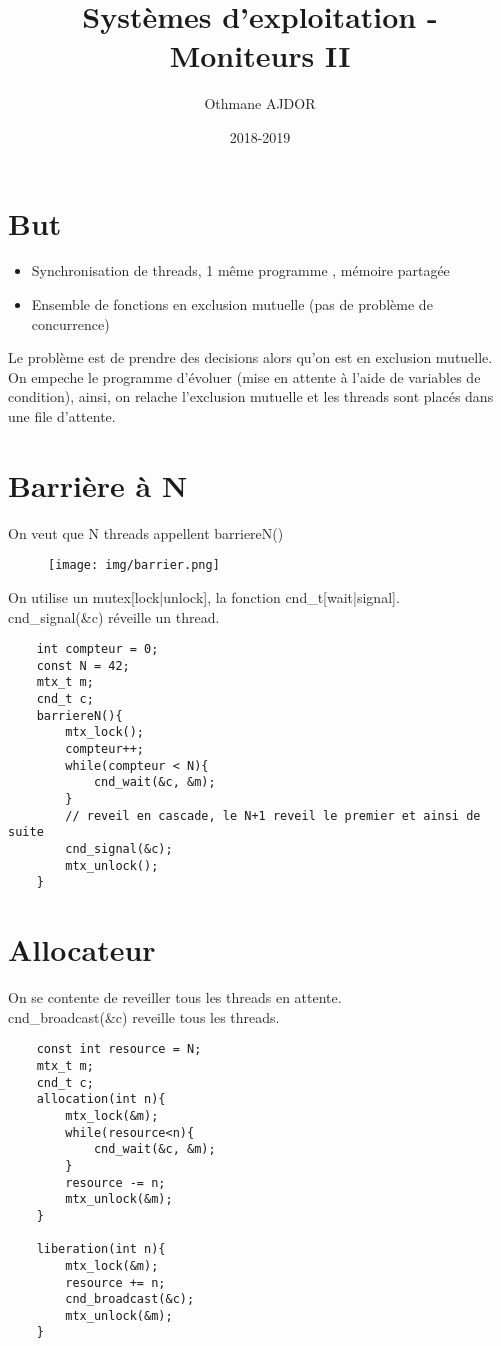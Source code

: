 \documentclass[11pt]{article}
\title{Systèmes d'exploitation - Moniteurs II}
\author{Othmane AJDOR}
\date{2018-2019}
\begin{document}
\maketitle

\pagebreak
\tableofcontents
\pagebreak

\section{But}
\begin{itemize}
	\item Synchronisation de threads, 1 même programme , mémoire partagée
	\item Ensemble de fonctions en exclusion mutuelle (pas de problème de concurrence)
\end{itemize}
Le problème est de prendre des decisions alors qu'on est en exclusion mutuelle.
On empeche le programme d'évoluer (mise en attente à l'aide de variables de condition), ainsi, on relache l'exclusion mutuelle et les threads sont placés dans une file d'attente.

\section{Barrière à N}
On veut que N threads appellent barriereN()
\begin{figure}[h!]
	\centering
	\texttt{[image: img/barrier.png]}
\end{figure}

On utilise un mutex[lock|unlock], la fonction cnd\_t[wait|signal].\\
cnd\_signal(\&c) réveille un thread.

\begin{verbatim}
	int compteur = 0;
	const N = 42;
	mtx_t m;
	cnd_t c;
	barriereN(){
		mtx_lock();
		compteur++;
		while(compteur < N){
			cnd_wait(&c, &m);
		}
		// reveil en cascade, le N+1 reveil le premier et ainsi de suite
		cnd_signal(&c); 
		mtx_unlock();
	}
\end{verbatim}

\section{Allocateur}
On se contente de reveiller tous les threads en attente.\\
cnd\_broadcast(\&c) reveille tous les threads.
\vspace{-0.4cm}
\begin{verbatim}
	const int resource = N;
	mtx_t m;
	cnd_t c;
	allocation(int n){
		mtx_lock(&m);
		while(resource<n){
			cnd_wait(&c, &m);
		}
		resource -= n;
		mtx_unlock(&m);
	}

	liberation(int n){
		mtx_lock(&m);
		resource += n;
		cnd_broadcast(&c);
		mtx_unlock(&m);
	}
\end{verbatim}
\end{document}
